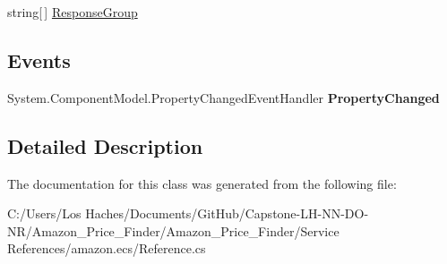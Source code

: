\begin{DoxyCompactItemize}
\begin{DoxyCompactList}\small\item\em \end{DoxyCompactList}\item 
\hypertarget{class_amazon___price___finder_1_1amazon_1_1ecs_1_1_cart_modify_request_aa453f0b3bda50a0db047100becaee165}{string\mbox{[}$\,$\mbox{]} \hyperlink{class_amazon___price___finder_1_1amazon_1_1ecs_1_1_cart_modify_request_aa453f0b3bda50a0db047100becaee165}{Response\-Group}}\label{class_amazon___price___finder_1_1amazon_1_1ecs_1_1_cart_modify_request_aa453f0b3bda50a0db047100becaee165}

\begin{DoxyCompactList}\small\item\em \end{DoxyCompactList}\end{DoxyCompactItemize}
\subsection*{Events}
\begin{DoxyCompactItemize}
\item 
\hypertarget{class_amazon___price___finder_1_1amazon_1_1ecs_1_1_cart_modify_request_acbe184e18948ad8426bdcfbb9b7529f5}{System.\-Component\-Model.\-Property\-Changed\-Event\-Handler {\bfseries Property\-Changed}}\label{class_amazon___price___finder_1_1amazon_1_1ecs_1_1_cart_modify_request_acbe184e18948ad8426bdcfbb9b7529f5}

\end{DoxyCompactItemize}


\subsection{Detailed Description}


The documentation for this class was generated from the following file\-:\begin{DoxyCompactItemize}
\item 
C\-:/\-Users/\-Los Haches/\-Documents/\-Git\-Hub/\-Capstone-\/\-L\-H-\/\-N\-N-\/\-D\-O-\/\-N\-R/\-Amazon\-\_\-\-Price\-\_\-\-Finder/\-Amazon\-\_\-\-Price\-\_\-\-Finder/\-Service References/amazon.\-ecs/Reference.\-cs\end{DoxyCompactItemize}
